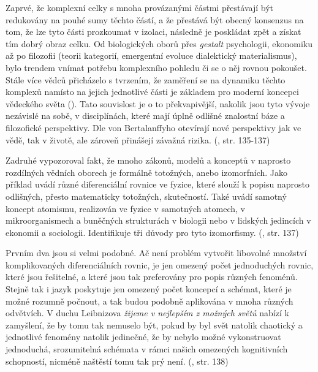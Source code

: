 \documentclass[11pt,a4paper]{article}
\begin{document}
Zaprvé, že komplexní celky s mnoha provázanými částmi přestávají být redukovány na pouhé sumy těchto částí, a že přestává být obecný konsenzus na tom, že lze tyto části prozkoumat v izolaci, následně je poskládat zpět a získat tím dobrý obraz celku. Od biologických oborů přes \textit{gestalt} psychologii, ekonomiku až po filozofii (teorii kategorií, emergentní evoluce dialektický materialismus), bylo trendem vnímat potřebu komplexního pohledu či se o něj rovnou pokoušet. Stále více vědců přicházelo s tvrzením, že zaměření se na dynamiku těchto komplexů namísto na jejich jednotlivé části je základem pro moderní koncepci vědeckého světa (\cite{wiener_cybernetics_2019, gleick_chaos_1998}). Tato souvislost je o to překvapivější, nakolik jsou tyto vývoje nezávislé na sobě, v disciplínách, které mají úplně odlišné znalostní báze a filozofické perspektivy. Dle von Bertalanffyho otevírají nové perspektivy jak ve vědě, tak v životě, ale zároveň přinášejí závažná rizika. (\cite{von_bertalanffy_outline_1950}, str. 135-137)

Zadruhé vypozoroval fakt, že mnoho zákonů, modelů a konceptů v naprosto rozdílných vědních oborech je formálně totožných, anebo izomorfních. Jako příklad uvádí různé diferenciální rovnice ve fyzice, které slouží k popisu naprosto odlišných, přesto matematicky totožných, skutečností. Také uvádí samotný koncept atomismu, realizován ve fyzice v samotných atomech, v mikroorganismech a buněčných strukturách v biologii nebo v lidských jedincích v ekonomii a sociologii. Identifikuje tři důvody pro tyto izomorfismy. (\cite{von_bertalanffy_outline_1950}, str. 137)

Prvním dva jsou si velmi podobné. Ač není problém vytvořit libovolné množství komplikovaných diferenciálních rovnic, je jen omezený počet jednoduchých rovnic, které jsou řešitelné, a které jsou tak preferovány pro popis různých fenoménů. Stejně tak i jazyk poskytuje jen omezený počet koncepcí a schémat, které je možné rozumně počnout, a tak budou podobně aplikována v mnoha různých odvětvích. V duchu Leibnizova \textit{žijeme v nejlepším z možných světů} nabízí k zamyšlení, že by tomu tak nemuselo být, pokud by byl svět natolik chaotický a jednotlivé fenomény natolik jedinečné, že by nebylo možné vykonstruovat jednoduchá, srozumitelná schémata v rámci našich omezených kognitivních schopností, nicméně naštěstí tomu tak prý není. (\cite{von_bertalanffy_outline_1950}, str. 138)
\end{document}
